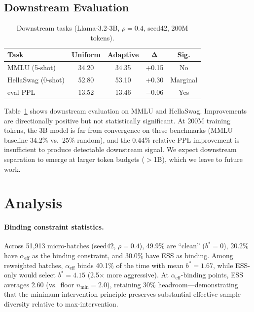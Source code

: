 \documentclass[11pt,a4paper]{article}
\newcommand{\bstar}{b^{*}}
\newcommand{\aeff}{\alpha_{\mathrm{eff}}}
\newcommand{\nmin}{n_{\min}}
\begin{document}
\subsection{Downstream Evaluation}
\label{sec:downstream}

\begin{table}[t]
\centering
\small
\caption{Downstream tasks (Llama-3.2-3B, $\rho=0.4$, seed42, 200M tokens).}
\label{tab:downstream}
\begin{tabular}{lcccc}
\toprule
\textbf{Task} & \textbf{Uniform} & \textbf{Adaptive} & $\boldsymbol{\Delta}$ & \textbf{Sig.} \\
\midrule
MMLU (5-shot) & 34.20 & 34.35 & +0.15 & No \\
HellaSwag (0-shot) & 52.80 & 53.10 & +0.30 & Marginal \\
eval PPL & 13.52 & 13.46 & $-$0.06 & Yes \\
\bottomrule
\end{tabular}
\end{table}

Table~\ref{tab:downstream} shows downstream evaluation on MMLU and HellaSwag.
Improvements are directionally positive but not statistically significant.
At 200M training tokens, the 3B model is far from convergence on these benchmarks (MMLU baseline 34.2\% vs.\ 25\% random), and the 0.44\% relative PPL improvement is insufficient to produce detectable downstream signal.
We expect downstream separation to emerge at larger token budgets ($>$1B), which we leave to future work.

\section{Analysis}
\label{sec:analysis}

\paragraph{Binding constraint statistics.}
Across 51,913 micro-batches (seed42, $\rho=0.4$), 49.9\% are ``clean'' ($\bstar=0$), 20.2\% have $\aeff$ as the binding constraint, and 30.0\% have ESS as binding.
Among reweighted batches, $\aeff$ binds 40.1\% of the time with mean $\bstar=1.67$, while ESS-only would select $\bstar=4.15$ (2.5$\times$ more aggressive).
At $\aeff$-binding points, ESS averages 2.60 (vs.\ floor $\nmin=2.0$), retaining 30\% headroom---demonstrating that the minimum-intervention principle preserves substantial effective sample diversity relative to max-intervention.
\end{document}
